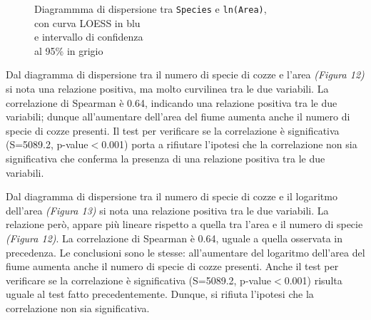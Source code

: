 \documentclass{article} %
\begin{document}
\begin{figure}[H]
\begin{minipage}{0.49\textwidth}
        \captionsetup{justification=centering}
        \caption{Diagrammma di dispersione tra \texttt{Species} e \texttt{ln(Area)}, \\con curva LOESS in blu \\e intervallo di confidenza \\al 95\% in grigio}
    \end{minipage}
\end{figure}

Dal diagramma di dispersione tra il numero di specie di cozze e l'area \textit{(Figura 12)} si nota una relazione positiva, ma molto curvilinea tra le due variabili.  
La correlazione di Spearman è 0.64, indicando una relazione positiva tra le due variabili; dunque all'aumentare dell'area del fiume aumenta anche il numero di specie di cozze presenti.
Il test per verificare se la correlazione è significativa (S=5089.2, p-value$<$0.001) porta a rifiutare l'ipotesi che la correlazione non sia significativa che conferma la presenza di una relazione positiva tra le due variabili.

Dal diagramma di dispersione tra il numero di specie di cozze e il logaritmo dell'area \textit{(Figura 13)} si nota una relazione positiva tra le due variabili. La relazione però, appare più lineare rispetto a quella tra l'area e il numero di specie \textit{(Figura 12)}.  
La correlazione di Spearman è 0.64, uguale a quella osservata in precedenza. Le conclusioni sono le stesse: all'aumentare del logaritmo dell'area del fiume aumenta anche il numero di specie di cozze presenti.
Anche il test per verificare se la correlazione è significativa (S=5089.2, p-value$<$0.001) risulta uguale al test fatto precedentemente. Dunque, si rifiuta l'ipotesi che la correlazione non sia significativa.
\end{document}
